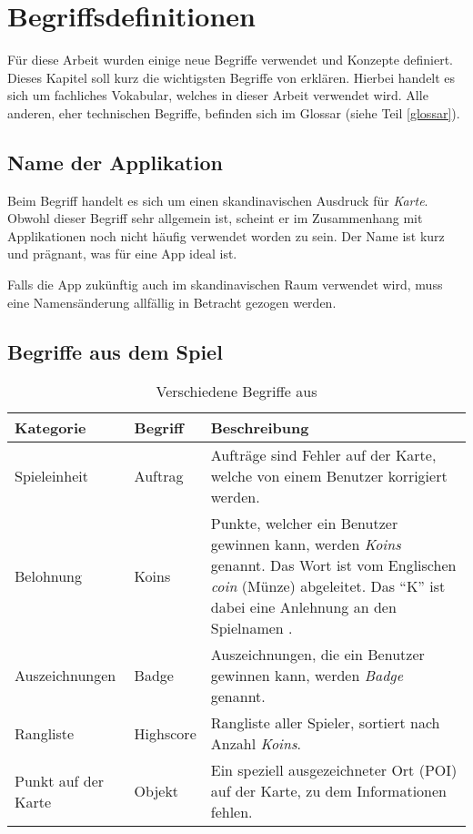 \chapter{Begriffsdefinitionen}
\label{kort-definitionen}

Für diese Arbeit wurden einige neue Begriffe verwendet und Konzepte definiert.
Dieses Kapitel soll kurz die wichtigsten Begriffe von \kort{} erklären.
Hierbei handelt es sich um fachliches Vokabular, welches in dieser Arbeit verwendet wird.
Alle anderen, eher technischen Begriffe, befinden sich im Glossar (siehe Teil \ref{glossar}).

\section{Name der Applikation}
Beim Begriff \kort{} handelt es sich um einen skandinavischen Ausdruck für \emph{Karte}.
Obwohl dieser Begriff sehr allgemein ist, scheint er im Zusammenhang mit Applikationen noch nicht häufig verwendet worden zu sein.
Der Name ist kurz und prägnant, was für eine App ideal ist.

Falls die App zukünftig auch im skandinavischen Raum verwendet wird, muss eine Namensänderung allfällig in Betracht gezogen werden.

\section{Begriffe aus dem Spiel}

\begin{table}[H]
\centering
\begin{tabular}{|p{0.2\threecelltabwidth}|p{0.12\threecelltabwidth}|p{0.68\threecelltabwidth}|}
\hline 
\small{\textbf{Kategorie}} & \small{\textbf{Begriff}} & \small{\textbf{Beschreibung}} \\
\hline 
Spieleinheit & Auftrag & Aufträge sind Fehler auf der Karte, welche von einem Benutzer korrigiert werden. \\
\hline 
Belohnung & Koins & Punkte, welcher ein Benutzer gewinnen kann, werden \emph{Koins} genannt.
Das Wort ist vom Englischen \emph{coin} (Münze) abgeleitet. 
Das "`K"' ist dabei eine Anlehnung an den Spielnamen \kort{}. \\
\hline 
Auszeichnungen & Badge & Auszeichnungen, die ein Benutzer gewinnen kann, werden \emph{Badge} genannt. \\
\hline 
Rangliste & Highscore & Rangliste aller Spieler, sortiert nach Anzahl \emph{Koins}. \\
\hline 
Punkt auf der Karte & Objekt & Ein speziell ausgezeichneter Ort (\gls{POI}) auf der Karte, zu dem Informationen fehlen. \\
\hline 
\end{tabular}
\caption{Verschiedene Begriffe aus \kort{}}
\label{table-definitionen}
\end{table}